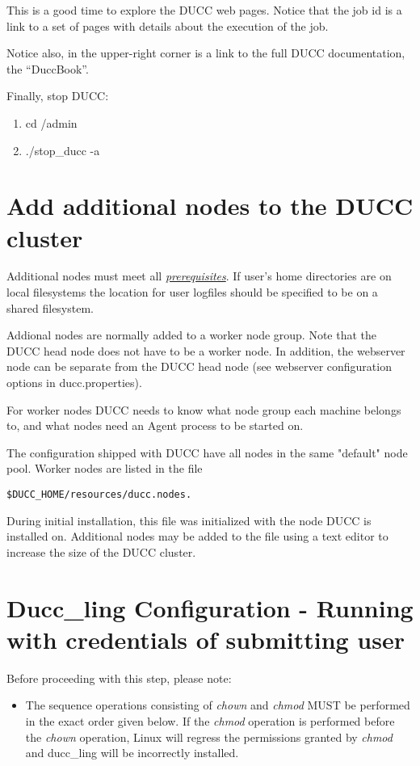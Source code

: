     This is a good time to explore the DUCC web pages.  Notice that the job id is a link to a set of
    pages with details about the execution of the job.

    Notice also, in the upper-right corner is a link to the full DUCC documentation, the ``DuccBook''.

    Finally, stop DUCC:
    \begin{enumerate}
      \item cd \duccruntime/admin
      \item./stop\_ducc -a
      \end{enumerate}
      

\section{Add additional nodes to the DUCC cluster}
   Additional nodes must meet all \hyperref[sec:install.prerequisites]{\em prerequisites}.
   If user's home directories are on local filesystems the location for user logfiles
   should be specified to be on a shared filesystem. 

   Addional nodes are normally added to a worker node group. Note that the
   DUCC head node does not have to be a worker node.
   In addition, the webserver node can be separate from the DUCC head node 
   (see webserver configuration options in ducc.properties).

   For worker nodes DUCC needs to know what node group
   each machine belongs to, and what nodes need an Agent process to be started on.

   The configuration shipped with DUCC have all nodes in the same "default" node pool.
   Worker nodes are listed in the file
\begin{verbatim}
$DUCC_HOME/resources/ducc.nodes.  
\end{verbatim}
   
   During initial installation, this file was initialized with the node DUCC is installed on.
   Additional nodes may be added to the file using a text editor to increase the size of the DUCC
   cluster.


\section{Ducc\_ling Configuration - Running with credentials of submitting user}
\label{sec:duccling.install}

    Before proceeding with this step, please note: 
    \begin{itemize}
        \item The sequence operations consisting of {\em chown} and {\em chmod} MUST be performed
          in the exact order given below.  If the {\em chmod} operation is performed before
          the {\em chown} operation, Linux will regress the permissions granted by {\em chmod} 
          and ducc\_ling will be incorrectly installed.
    \end{itemize}

